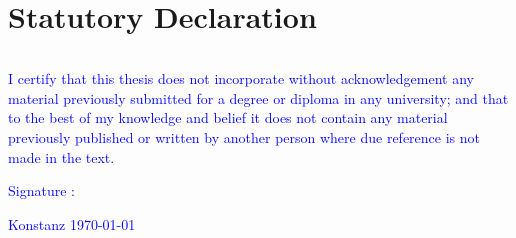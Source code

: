 \section*{ Statutory Declaration  }
\thispagestyle{empty}

\begin{verbatim}

\end{verbatim}

\textcolor{blue}{
I certify that this thesis does not incorporate without acknowledgement any material
previously submitted for a degree or diploma in any university; and that to the best of
my knowledge and belief it does not contain any material previously published or written
by another person where due reference is not made in the text.
}

\begin{flushleft}
\textcolor{blue}{Signature :}

\end{flushleft}

 
\begin{flushright}
\textcolor{blue}{Konstanz \today}

\end{flushright} 
 